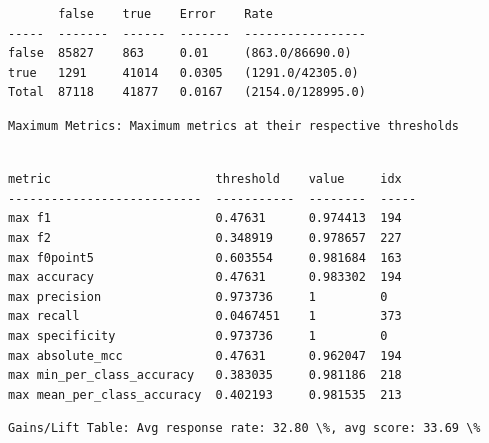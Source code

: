 \documentclass[11pt]{article}
\begin{document}
    
    \begin{verbatim}
       false    true    Error    Rate
-----  -------  ------  -------  -----------------
false  85827    863     0.01     (863.0/86690.0)
true   1291     41014   0.0305   (1291.0/42305.0)
Total  87118    41877   0.0167   (2154.0/128995.0)
    \end{verbatim}

    
    \begin{Verbatim}[commandchars=\\\{\}]
Maximum Metrics: Maximum metrics at their respective thresholds


    \end{Verbatim}

    
    \begin{verbatim}
metric                       threshold    value     idx
---------------------------  -----------  --------  -----
max f1                       0.47631      0.974413  194
max f2                       0.348919     0.978657  227
max f0point5                 0.603554     0.981684  163
max accuracy                 0.47631      0.983302  194
max precision                0.973736     1         0
max recall                   0.0467451    1         373
max specificity              0.973736     1         0
max absolute_mcc             0.47631      0.962047  194
max min_per_class_accuracy   0.383035     0.981186  218
max mean_per_class_accuracy  0.402193     0.981535  213
    \end{verbatim}

    
    \begin{Verbatim}[commandchars=\\\{\}]
Gains/Lift Table: Avg response rate: 32.80 \%, avg score: 33.69 \%


    \end{Verbatim}
\end{document}
